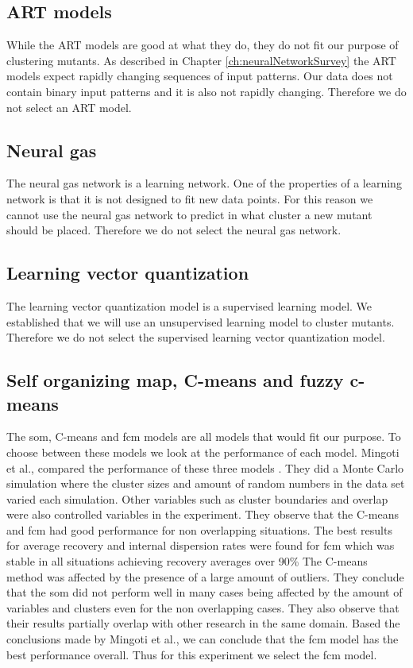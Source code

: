 \documentclass[../../main]{subfiles}
\begin{document}
\subsection{ART models}
While the ART models are good at what they do, they do not fit our purpose of clustering mutants.
As described in Chapter \ref{ch:neuralNetworkSurvey} the ART models expect rapidly changing sequences of input patterns.
Our data does not contain binary input patterns and it is also not rapidly changing.
Therefore we do not select an ART model.

\subsection{Neural gas}
The neural gas network is a learning network.
One of the properties of a learning network is that it is not designed to fit new data points\cite{supervisedUnsupervised}.
For this reason we cannot use the neural gas network to predict in what cluster a new mutant should be placed.
Therefore we do not select the neural gas network.

\subsection{Learning vector quantization}
The learning vector quantization model is a supervised learning model.
We established that we will use an unsupervised learning model to cluster mutants.
Therefore we do not select the supervised learning vector quantization model.

\subsection{Self organizing map, C-means and fuzzy c-means}
\label{ch:topThreeModels}
The \acrfull{som}, C-means and \acrfull{fcm} models are all models that would fit our purpose. 
To choose between these models we look at the performance of each model.
Mingoti et al., compared the performance of these three models \cite{Mingoti2006ComparingAlgorithms}.
They did a Monte Carlo simulation where the cluster sizes and amount of random numbers in the data set varied each simulation\cite{Mingoti2006ComparingAlgorithms}.
Other variables such as cluster boundaries and overlap were also controlled variables in the experiment.
They observe that the C-means and \acrlong{fcm} had good performance for non overlapping situations\cite{Mingoti2006ComparingAlgorithms}.
The best results for average recovery and internal dispersion rates were found for \acrlong{fcm} which was stable in all situations achieving recovery averages over 90\%\cite{Mingoti2006ComparingAlgorithms}
The C-means method was affected by the presence of a large amount of outliers.
They conclude that the \acrshort{som} did not perform well in many cases being affected by the amount of variables and clusters even for the non overlapping cases\cite{Mingoti2006ComparingAlgorithms}.
They also observe  that their results partially overlap with other research in the same domain.
\newline
Based the conclusions made by Mingoti et al., we can conclude that the \acrshort{fcm} model has the best performance overall.
Thus for this experiment we select the \acrshort{fcm} model.
\end{document}
